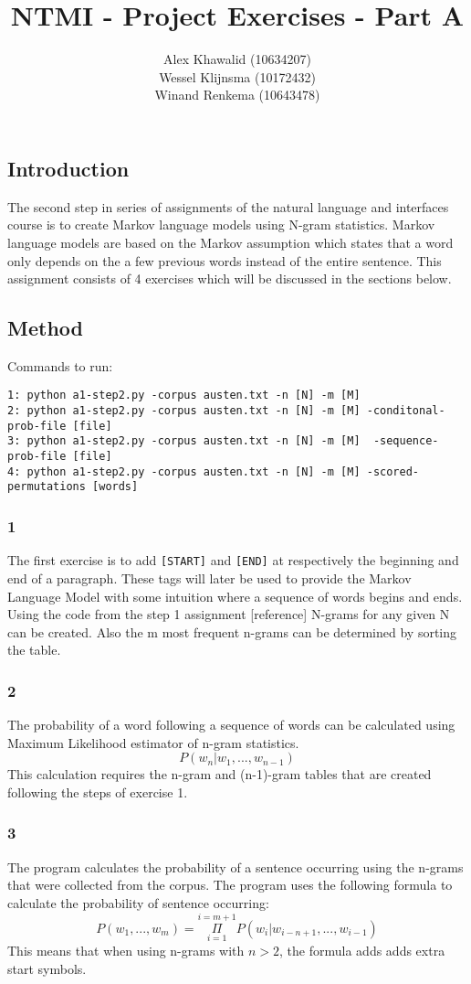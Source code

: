 \documentclass[a4paper, 10pt]{article}
\title{NTMI - Project Exercises - Part A}
\author{Alex Khawalid (10634207)\\
Wessel Klijnsma (10172432)\\
Winand Renkema (10643478)\\
}
\begin{document}
\maketitle
\subsection*{Introduction}
The second step in series of assignments of the natural language and interfaces course is to create Markov language models using N-gram statistics. Markov language models are based on the Markov assumption which states that a word only depends on the a few previous words instead of the entire sentence. This assignment consists of 4 exercises which will be discussed in the sections below. 

\subsection*{Method}
Commands to run: 
\begin{verbatim}
1: python a1-step2.py -corpus austen.txt -n [N] -m [M]
2: python a1-step2.py -corpus austen.txt -n [N] -m [M] -conditonal-prob-file [file] 
3: python a1-step2.py -corpus austen.txt -n [N] -m [M]  -sequence-prob-file [file] 
4: python a1-step2.py -corpus austen.txt -n [N] -m [M] -scored-permutations [words]
\end{verbatim}
                   
\subsubsection*{1}
The first exercise is to add \texttt{[START]} and \texttt{[END]} at respectively the beginning and end of a paragraph. These tags will later be used to provide the Markov Language Model with some intuition where a sequence of words begins and ends. Using the code from the step 1 assignment [reference] N-grams for any given N can be created. Also the m most frequent n-grams can be determined by sorting the table.

\subsubsection*{2}
The probability of a word following a sequence of words can be calculated using Maximum Likelihood estimator of n-gram statistics. 
$$P(w_n|w_{1},...,w_{n-1})$$
This calculation requires the n-gram and (n-1)-gram tables that are created following the steps of exercise 1.

\subsubsection*{3}
The program calculates the probability of a sentence occurring using the n-grams that were collected from the corpus. The program uses the following formula to calculate the probability of sentence occurring:
$$P(w_1,...,w_m) = \underset{i=1}{\stackrel{i=m+1}{\Pi}} P(w_i|w_{i-n+1},...,w_{i-1})$$
This means that when using n-grams with $n > 2$, the formula adds adds extra start symbols.
\end{document}
